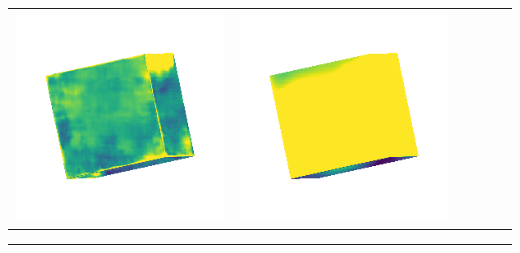 \begin{center}
\begin{tabularx}{\linewidth}{@{}Y@{}Y@{}Y@{}Y@{}Y@{}Y@{}}
\includegraphics[width=\linewidth]{semisynthetic/20150514_0_marrnet_err.png} &
\includegraphics[width=\linewidth]{semisynthetic/20150514_0_ef_err.png} \\
\end{tabularx}
\begin{center}\rule{0.5\linewidth}{\linethickness}\end{center}


\end{center}
